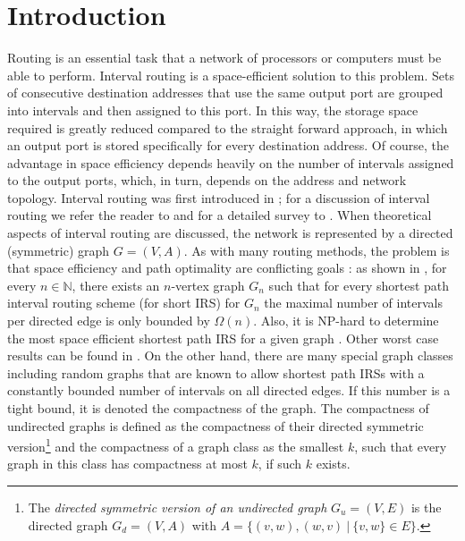 \documentclass[10pt]{article}
\begin{document}
\section{Introduction}











Routing is an essential task that a network of processors or computers must be able to 
perform. Interval routing is a space-efficient solution to this problem.
Sets of consecutive destination addresses that use the same output port are grouped into 
intervals and then assigned to this port.
In this way, the storage space required is greatly reduced compared to the straight 
forward approach, in which an output port is stored specifically for every destination address.
Of course, the advantage in space efficiency depends heavily on the number of intervals assigned 
to the output ports, which, in turn, depends on the address and network topology.
Interval routing was first introduced in \cite{Santoro82routingwithout,Santoro85labelling}; 
for a discussion of interval routing we refer the reader 
to \cite{Leeuwen87interval,FredericksonJ88,Bakker91linearinterval} 
and for a detailed survey to \cite{Gavoille00asurvey}.
When theoretical aspects of interval routing are discussed, the network is represented 
by a directed (symmetric) graph $G=(V,A)$. 
As with many routing methods, the problem is that space efficiency and path optimality are 
conflicting goals \cite{65953}: as shown in \cite{Guevremont98worstcase}, for every $n\in\mathbb{N}$, 
there exists an $n$-vertex graph $G_n$ such that for every shortest 
path interval routing scheme (for short IRS) for $G_n$ the maximal number of intervals per directed edge 
is only bounded by $\Omega(n)$. Also, it is NP-hard to determine the most space efficient 
shortest path IRS for a given graph \cite{Eilam2002,Flammini1997}.
Other worst case results can be found in \cite{savio99onthespace}.
On the other hand, there are many special graph classes \cite{FG98} including 
random graphs \cite{GP1998} that are known to allow shortest path IRSs 
with a constantly bounded number of intervals on all directed edges. 
If this number is a tight bound, it is denoted the compactness of the graph.
The compactness of undirected graphs is defined as the compactness of their directed 
symmetric version\footnote{The \emph{directed symmetric version of an undirected graph} 
$G_u=(V,E)$ is the directed graph $G_d=(V,A)$ with $A=\{(v,w),(w,v)~|~\{v,w\}\in E\}.$}
and the compactness of a graph class as the smallest $k$, such that every graph in this 
class has compactness  at most $k$, if such $k$ exists.
\end{document}
